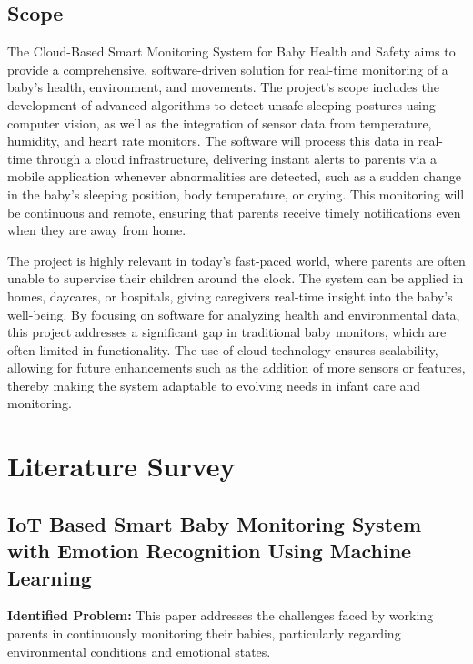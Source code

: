 \documentclass[12pt,a4paper]{report}
\begin{document}
\section{Scope}
The Cloud-Based Smart Monitoring System for Baby Health and Safety aims to provide a comprehensive, software-driven solution for real-time monitoring of a baby’s health, environment, and movements. The project’s scope includes the development of advanced algorithms to detect unsafe sleeping postures using computer vision, as well as the integration of sensor data from temperature, humidity, and heart rate monitors. The software will process this data in real-time through a cloud infrastructure, delivering instant alerts to parents via a mobile application whenever abnormalities are detected, such as a sudden change in the baby’s sleeping position, body temperature, or crying. This monitoring will be continuous and remote, ensuring that parents receive timely notifications even when they are away from home.

The project is highly relevant in today's fast-paced world, where parents are often unable to supervise their children around the clock. The system can be applied in homes, daycares, or hospitals, giving caregivers real-time insight into the baby’s well-being. By focusing on software for analyzing health and environmental data, this project addresses a significant gap in traditional baby monitors, which are often limited in functionality. The use of cloud technology ensures scalability, allowing for future enhancements such as the addition of more sensors or features, thereby making the system adaptable to evolving needs in infant care and monitoring.


\chapter{Literature Survey}

\section{IoT Based Smart Baby Monitoring System with Emotion Recognition Using Machine Learning}

\textbf{Identified Problem: }This paper addresses the challenges faced by working parents in continuously monitoring their babies, particularly regarding environmental conditions and emotional states\cite{alam2023iot}.
\setlength{\parskip}{1em}  %
\end{document}
